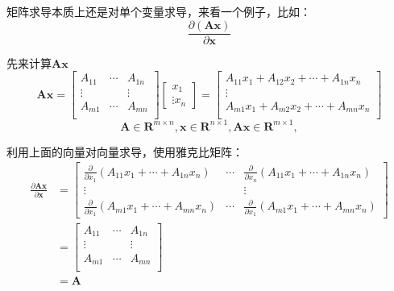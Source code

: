 \documentclass[12pt]{article}
\begin{document}
\begin{framed}  
矩阵求导本质上还是对单个变量求导，来看一个例子，比如：
$$
\frac{\partial (\mathbf{A}\mathbf{x})}{\partial \mathbf{x}}
$$

先来计算$\mathbf{A}\mathbf{x}$
$$
\mathbf{A}\mathbf{x} = \begin{bmatrix}
    A_{11} & \cdots & A_{1n} \\
    \vdots &        & \vdots \\
    A_{m1} & \cdots & A_{mn} \\
\end{bmatrix}
\begin{bmatrix}
   x_1 \\ \vdots x_n
\end{bmatrix}
= 
\begin{bmatrix}
A_{11}x_1 + A_{12}x_2 + \cdots + A_{1n}x_n \\
\vdots \\
A_{m1}x_1 + A_{m2}x_2 + \cdots + A_{mn}x_n \\
\end{bmatrix}
$$
$$
\mathbf{A} \in \mathbf{R}^{m \times n}, 
\mathbf{x} \in \mathbf{R}^{n \times 1},
\mathbf{Ax} \in \mathbf{R}^{m \times 1},
$$

利用上面的向量对向量求导，使用雅克比矩阵：
\begin{align*}
\frac{\partial \mathbf{Ax}}{\partial \mathbf{x}} &= \begin{bmatrix}
    \frac{\partial}{\partial x_1}(A_{11}x_1 +         \cdots + A_{1n}x_n) & \cdots & 
    \frac{\partial}{\partial x_n}(A_{11}x_1 +         \cdots + A_{1n}x_n) \\
    \vdots & & \vdots \\
    \frac{\partial}{\partial x_1}(A_{m1}x_1 +         \cdots + A_{mn}x_n) & \cdots &
    \frac{\partial}{\partial x_1}(A_{m1}x_1 +         \cdots + A_{mn}x_n)
\end{bmatrix} \\
    &= 
\begin{bmatrix}
    A_{11} & \cdots & A_{1n} \\
    \vdots & & \vdots \\
    A_{m1} & \cdots & A_{mn} \\
\end{bmatrix} \\
&= \mathbf{A}
\end{align*}
\end{framed}



\end{document}

